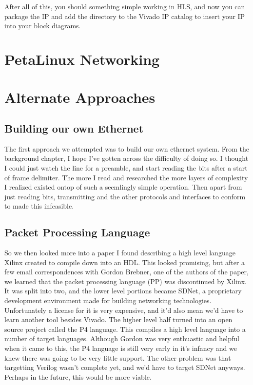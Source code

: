 \documentclass[12pt]{report}
\begin{document}
After all of this, you should something simple working in HLS, and now you can package the IP and add the directory to the Vivado IP catalog to insert your IP into your block diagrams.

\chapter{PetaLinux Networking}

\chapter{Alternate Approaches}
\section{Building our own Ethernet}
The first approach we attempted was to build our own ethernet system. From the background chapter, I hope I've gotten across the difficulty of doing so. I thought I could just watch the line for a preamble, and start reading the bits after a start of frame delimiter. The more I read and researched the more layers of complexity I realized existed ontop of such a seemlingly simple operation. Then apart from just reading bits, transmitting and the other protocols and interfaces to conform to made this infeasible.

\section{Packet Processing Language}
So we then looked more into a paper \cite{pp} I found describing a high level language Xilinx created to compile down into an HDL. This looked promising, but after a few email correspondences with Gordon Brebner, one of the authors of the paper, we learned that the packet processing language (PP) was discontinued by Xilinx. It was split into two, and the lower level portions became SDNet, a proprietary development environment made for building networking technologies. Unfortunately a license for it is very expensive, and it'd also mean we'd have to learn another tool besides Vivado.
The higher level half turned into an open source project called the P4 language.
This compiles a high level language into a number of target languages. Although Gordon was very enthuastic and helpful when it came to this, the P4 language is still very early in it's infancy and we knew there was going to be very little support. The other problem was that targetting Verilog wasn't complete yet, and we'd have to target SDNet anyways. Perhaps in the future, this would be more viable.
\end{document}
